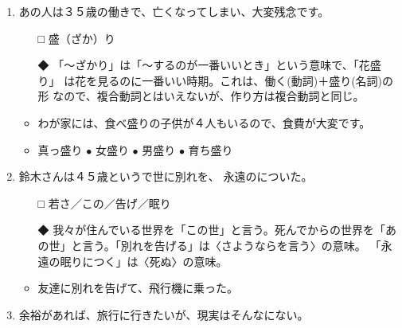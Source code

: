 \documentclass[
uplatex,
b5paper,
10pt,
dvipdfmx
]{jsbook}
\begin{document}
\begin{enumerate}
\item あの人は３５歳の働き\underline{\hspace{3zw}}で、亡くなってしまい、大変残念です。

\begin{itemize}
\item[□] 盛（ざか）り
\item[◆] 「〜ざかり」は「〜するのが一番いいとき」という意味で、「花盛り」
	  は花を見るのに一番いい時期。これは、働く(動詞)＋盛り(名詞)の形
	  なので、複合動詞とはいえないが、作り方は複合動詞と同じ。
\end{itemize}
\begin{itemize}
 \item わが家には、食べ盛りの子供が４人もいるので、食費が大変です。
 \item 真っ盛り $\bullet$ 女盛り $\bullet$ 男盛り $\bullet$ 育ち盛り
\end{itemize}

\item 鈴木さんは４５歳という\underline{\hspace{3zw}}で\underline{\hspace{3zw}}世に別れを\underline{\hspace{3zw}}、
      永遠の\underline{\hspace{3zw}}についた。

\begin{itemize}
\item[□] 若さ／この／告げ／眠り
\item[◆] 我々が住んでいる世界を「この世」と言う。死んでからの世界を「あ
	  の世」と言う。「別れを告げる」は〈さようならを言う〉の意味。
	  「永遠の眠りにつく」は〈死ぬ〉の意味。
\end{itemize}
\begin{itemize}
 \item 友達に別れを告げて、飛行機に乗った。
\end{itemize}

\item 余裕があれば、旅行に\underline{\hspace{3zw}}行きたいが、現実はそんなに\underline{\hspace{3zw}}ない。


\end{enumerate}
\end{document}
